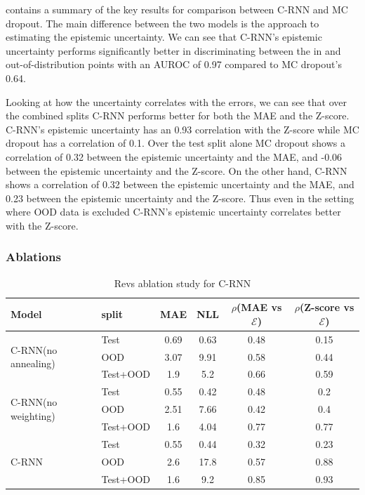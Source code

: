  contains a summary of the key results for comparison between C-RNN and MC dropout. The main difference between the two models is the approach to estimating the epistemic uncertainty. We can see that C-RNN's epistemic uncertainty performs significantly better in discriminating between the in and out-of-distribution points with an AUROC of 0.97 compared to MC dropout's 0.64.

Looking at how the uncertainty correlates with the errors, we can see that over the combined splits C-RNN performs better for both the MAE and the Z-score. C-RNN's epistemic uncertainty has an 0.93 correlation with the Z-score while MC dropout has a correlation of 0.1. Over the test split alone MC dropout shows a correlation of 0.32 between the epistemic uncertainty and the MAE, and -0.06 between the epistemic uncertainty and the Z-score. On the other hand, C-RNN shows a correlation of 0.32 between the epistemic uncertainty and the MAE, and 0.23 between the epistemic uncertainty and the Z-score. Thus even in the setting where OOD data is excluded C-RNN's epistemic uncertainty correlates better with the Z-score.    
 



\subsubsection{Ablations}

\begin{table}[htbp]
\centering
    \begin{tabular}{l l c c c c }  
        \toprule
        Model & split & MAE & NLL & $\rho$(MAE vs $\mathcal{E}$) &
        $\rho$(Z-score vs $\mathcal{E}$)\\
        \midrule
        \multirow{3}{*}{C-RNN(no annealing)} 
            & Test     & 0.69 & 0.63 & 0.48  & 0.15\\  
            & OOD      & 3.07 & 9.91 & 0.58  & 0.44\\  
            & Test+OOD & 1.9  & 5.2  & 0.66  & 0.59\\ 

        \midrule
        \multirow{3}{*}{C-RNN(no weighting)} 
            & Test     & 0.55 & 0.42  & 0.48  & 0.2\\  
            & OOD      & 2.51 & 7.66  & 0.42  & 0.4 \\  
            & Test+OOD & 1.6  & 4.04  & 0.77  & 0.77\\ 
            
        \midrule
        \multirow{3}{*}{C-RNN} 
            & Test     & 0.55& 0.44 & 0.32  & 0.23\\  
            & OOD      & 2.6 & 17.8 & 0.57  & 0.88\\  
            & Test+OOD & 1.6 & 9.2  & 0.85  & 0.93\\ 

        \toprule
    \end{tabular}
    \caption{Revs ablation study for C-RNN}
    \label{tbl:revs_ablation}
\end{table}


